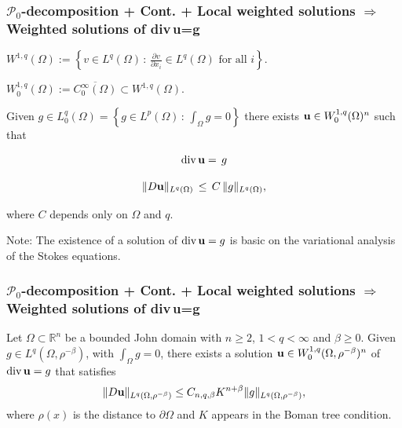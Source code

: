 \documentclass[small,xcolor=svgnames]{beamer}
\def\di{\mbox{\rm div\,}}
\def\O{\Omega}
\def\R{{\mathbb R}}
\def\uu{{\bf u}}
\def\P{\mathcal{P}}
\begin{document}
\begin{frame}\frametitle{$\P_0$-decomposition + Cont. + Local weighted solutions $\Rightarrow$ \\ Weighted solutions of \di\uu=g}

        
  $W^{1,q}(\O):=\left\{v\in L^q(\O)\,:\,\frac{\partial v}{\partial x_i}\in L^q(\O)\text{ for all }i\right\}.$
  
  \bigskip
  
  $W_0^{1,q}(\O):= \overline{C_0^\infty(\O)}\subset W^{1,q}(\O)$.

   \bigskip 
        
        
Given $g\in L^q_0(\Omega)=\left\{g\in L^p(\Omega)\,:\,\int_\Omega g=0\right\}$ there exists $\uu\in W_0^{1,q}(\Omega)^n$ such that 

\[
\di \uu=\,g\]

\[\|D\uu\|_{L^q(\O)}\,\leq\,C\,\|g\|_{L^q(\O)},\]

where $C$ depends only on $\O$ and $q$.
\bigskip 

Note: The existence of a solution of $\di\uu=g$ is basic on the variational analysis of the Stokes equations.


\end{frame}        
        
        


\begin{frame}\frametitle{$\P_0$-decomposition + Cont. + Local weighted solutions $\Rightarrow$ \\ Weighted solutions of \di\uu=g}

\begin{theorem}
Let $\O\subset\R^n$ be a bounded John domain with $n\geq 2$, $1<q<\infty$ and $\beta\geq 0$. Given $g\in L^q(\O,\rho^{-\beta})$, with $\int_\O g=0$, there exists a solution $\uu\in W^{1,q}_0(\O,\rho^{-\beta})^n$ of $\di\uu=g$ that satisfies
\begin{eqnarray*}
\|D\uu\|_{L^q(\O,\rho^{-\beta})}\leq C_{n,q,\beta} K^{n+\beta} \|g\|_{L^q(\O,\rho^{-\beta})},
\end{eqnarray*}
where $\rho(x)$ is the distance to $\partial\Omega$  and $K$ appears in the Boman tree condition.
\end{theorem}


\end{frame}

  
\end{document}
